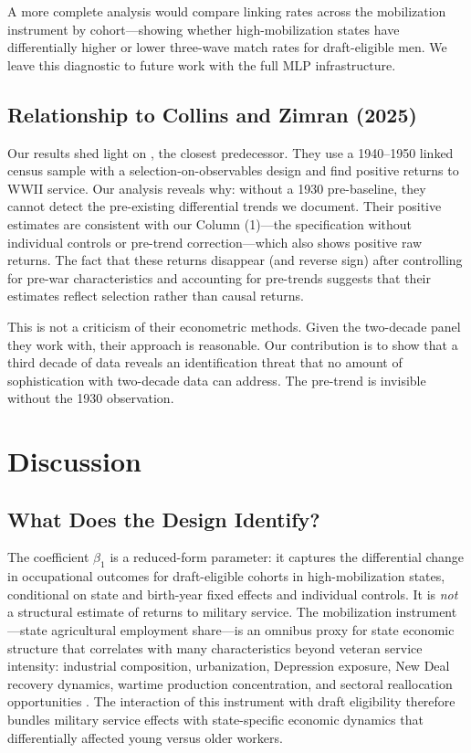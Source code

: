 \documentclass[12pt]{article}
\begin{document}
A more complete analysis would compare linking rates across the mobilization instrument by cohort---showing whether high-mobilization states have differentially higher or lower three-wave match rates for draft-eligible men. We leave this diagnostic to future work with the full MLP infrastructure.

\subsection{Relationship to Collins and Zimran (2025)}

Our results shed light on \citet{collinszimran2025}, the closest predecessor. They use a 1940--1950 linked census sample with a selection-on-observables design and find positive returns to WWII service. Our analysis reveals why: without a 1930 pre-baseline, they cannot detect the pre-existing differential trends we document. Their positive estimates are consistent with our Column (1)---the specification without individual controls or pre-trend correction---which also shows positive raw returns. The fact that these returns disappear (and reverse sign) after controlling for pre-war characteristics and accounting for pre-trends suggests that their estimates reflect selection rather than causal returns.

This is not a criticism of their econometric methods. Given the two-decade panel they work with, their approach is reasonable. Our contribution is to show that a third decade of data reveals an identification threat that no amount of sophistication with two-decade data can address. The pre-trend is invisible without the 1930 observation.

\section{Discussion}

\subsection{What Does the Design Identify?}

The coefficient $\beta_1$ is a reduced-form parameter: it captures the differential change in occupational outcomes for draft-eligible cohorts in high-mobilization states, conditional on state and birth-year fixed effects and individual controls. It is \textit{not} a structural estimate of returns to military service. The mobilization instrument---state agricultural employment share---is an omnibus proxy for state economic structure that correlates with many characteristics beyond veteran service intensity: industrial composition, urbanization, Depression exposure, New Deal recovery dynamics, wartime production concentration, and sectoral reallocation opportunities \citep{acemoglu2004}. The interaction of this instrument with draft eligibility therefore bundles military service effects with state-specific economic dynamics that differentially affected young versus older workers.
\end{document}

